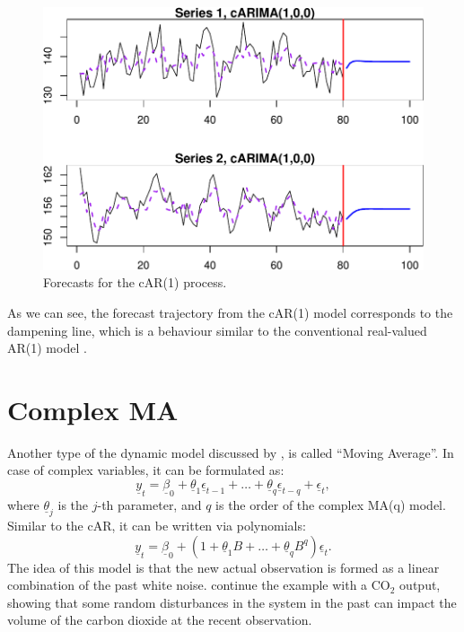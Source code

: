 \documentclass[
]{book}
\begin{document}
\begin{figure}
\centering
\includegraphics{Svetunkov---Svetunkov---Complex-Valued-Econometrics_files/figure-latex/complexAR1Forecast-1.pdf}
\caption{\label{fig:complexAR1Forecast}Forecasts for the cAR(1) process.}
\end{figure}

As we can see, the forecast trajectory from the cAR(1) model corresponds to the dampening line, which is a behaviour similar to the conventional real-valued AR(1) model \citep[e.g.~discussed in Subsection 8.1.1 of][]{SvetunkovAdam}.

\hypertarget{complex-ma}{%
\section{Complex MA}\label{complex-ma}}

Another type of the dynamic model discussed by \citet{Box1976}, is called ``Moving Average''. In case of complex variables, it can be formulated as:
\begin{equation}
    \underline{y}_t = \underline{\beta}_0 + \underline{\theta}_1 \underline{\epsilon}_{t-1} + \dots + \underline{\theta}_q \underline{\epsilon}_{t-q} + \underline{\epsilon}_t ,
    \label{eq:ComplexMA}
\end{equation}
where \(\underline\theta_j\) is the \(j\)-th parameter, and \(q\) is the order of the complex MA(q) model. Similar to the cAR, it can be written via polynomials:
\begin{equation}
    \underline{y}_t  = \underline{\beta}_0 + \left(1 + \underline{\theta}_1 B + \dots + \underline{\theta}_q B^q \right) \underline{\epsilon}_t .
    \label{eq:ComplexMAPolynomial}
\end{equation}
The idea of this model is that the new actual observation is formed as a linear combination of the past white noise. \citet{Box1976} continue the example with a CO\(_2\) output, showing that some random disturbances in the system in the past can impact the volume of the carbon dioxide at the recent observation.
\end{document}
